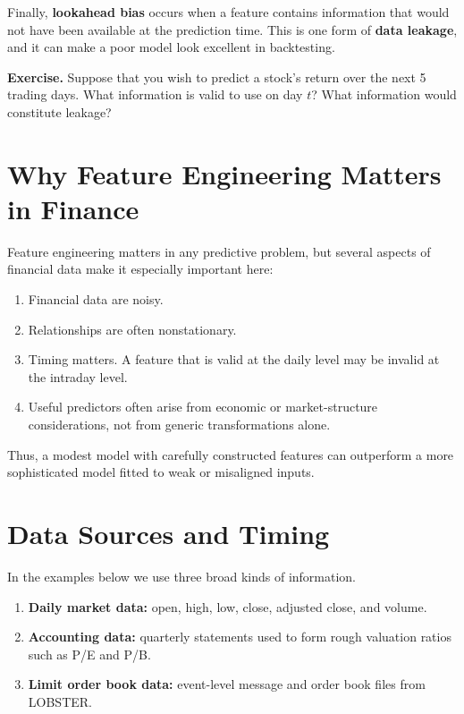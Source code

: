 \documentclass[11pt]{article}
\newcommand{\answerlines}[1]{\vspace{#1\baselineskip}}
\begin{document}
Finally, \textbf{lookahead bias} occurs when a feature contains information
that would not have been available at the prediction time. This is one form of
\textbf{data leakage}, and it can make a poor model look excellent in
backtesting.

\textbf{Exercise.} Suppose that you wish to predict a stock's return over the
next 5 trading days. What information is valid to use on day $t$? What
information would constitute leakage?

\answerlines{8}

\newpage

\section*{Why Feature Engineering Matters in Finance}

Feature engineering matters in any predictive problem, but several aspects of
financial data make it especially important here:

\begin{enumerate}
  \item Financial data are noisy.
  \item Relationships are often nonstationary.
  \item Timing matters. A feature that is valid at the daily level may be
  invalid at the intraday level.
  \item Useful predictors often arise from economic or market-structure
  considerations, not from generic transformations alone.
\end{enumerate}

Thus, a modest model with carefully constructed features can outperform a more
sophisticated model fitted to weak or misaligned inputs.

\section*{Data Sources and Timing}

In the examples below we use three broad kinds of information.

\begin{enumerate}
  \item \textbf{Daily market data:} open, high, low, close, adjusted close, and volume.
  \item \textbf{Accounting data:} quarterly statements used to form rough valuation ratios such as P/E and P/B.
  \item \textbf{Limit order book data:} event-level message and order book files from LOBSTER.
\end{enumerate}
\end{document}
